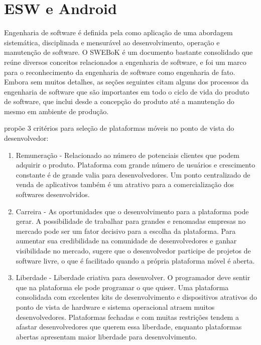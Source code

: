 \chapter{ESW e Android}
\label{cap:eswandroid}

Engenharia de software é definida pela \cite{swebok} como aplicação de uma abordagem sistemática, disciplinada e mensurável ao desenvolvimento, operação e manutenção de software. O SWEBoK é um documento bastante consolidado que reúne diversos conceitos relacionados a engenharia de software, e foi um marco para o reconhecimento da engenharia de software como engenharia de fato. Embora sem muitos detalhes, as seções seguintes citam alguns dos processos da engenharia de software que são importantes em todo o ciclo de vida do produto de software, que inclui desde a concepção do produto até a manutenção do mesmo em ambiente de produção.

 propõe 3 critérios para seleção de plataformas móveis no ponto de vista do desenvolvedor:
\begin{enumerate}
\item Remuneração - Relacionado ao número de potenciais clientes que podem adquirir o produto. Plataforma com grande número de usuários e crescimento constante é de grande valia para desenvolvedores. Um ponto centralizado de venda de aplicativos também é um atrativo para a comercialização dos softwares desenvolvidos.
\item Carreira - As oportunidades que o desenvolvimento para a plataforma pode gerar. A possibilidade de trabalhar para grandes e renomadas empresas no mercado pode ser um fator decisivo para a escolha da plataforma. Para aumentar sua credibilidade na comunidade de desenvolvedores e ganhar visibilidade no mercado,  sugere que o desenvolvedor participe de projetos de software livre, o que é facilitado quando a própria plataforma móvel é aberta.
\item Liberdade - Liberdade criativa para desenvolver. O programador deve sentir que na plataforma ele pode programar o que quiser. Uma plataforma consolidada com excelentes kits de desenvolvimento e dispositivos atrativos do ponto de vista de hardware e sistema operacional atraem muitos desenvolvedores. Plataformas fechadas e com muitas restrições tendem a afastar desenvolvedores que querem essa liberdade, enquanto plataformas abertas apresentam maior liberdade para desenvolvimento.
\end{enumerate}

